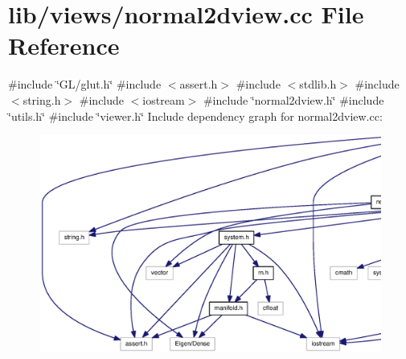 \section{lib/views/normal2dview.cc \-File \-Reference}
\label{normal2dview_8cc}
{\ttfamily \#include \char`\"{}\-G\-L/glut.\-h\char`\"{}}\*
{\ttfamily \#include $<$assert.\-h$>$}\*
{\ttfamily \#include $<$stdlib.\-h$>$}\*
{\ttfamily \#include $<$string.\-h$>$}\*
{\ttfamily \#include $<$iostream$>$}\*
{\ttfamily \#include \char`\"{}normal2dview.\-h\char`\"{}}\*
{\ttfamily \#include \char`\"{}utils.\-h\char`\"{}}\*
{\ttfamily \#include \char`\"{}viewer.\-h\char`\"{}}\*
\-Include dependency graph for normal2dview.\-cc\-:\nopagebreak
\begin{figure}[H]
\begin{center}
\leavevmode
\includegraphics[width=350pt]{normal2dview_8cc__incl}
\end{center}
\end{figure}
